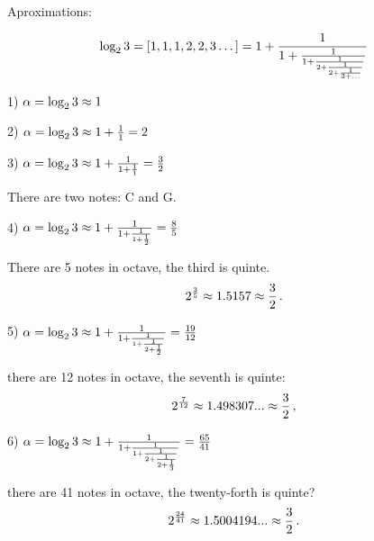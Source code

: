       Aproximations:

      $$
\log_2 3=[1,1,1,2,2,3\dots]=1+{1\over 1+{1\over 1+{1\over 2+
{1\over 2+{1\over 3+\dots}}}}}
      $$
 
  1) $\alpha=\log_2 3\approx 1$
  

  2) $\alpha=\log_2 3\approx 1+{1\over 1}=2$
  
  3) $\alpha=\log_2 3\approx 1+{1\over 1+{1\over 1}}={3\over 2}$
  
There are two notes: C and G.

\medskip

  4) $\alpha=\log_2 3\approx 1+{1\over 1+{1\over 1+{1\over 2}}}=
{8\over 5}$
  
There are 5 notes in octave,  the third is quinte.
          $$
    2^{3\over 5}\approx 1.5157\approx {3\over 2}\,.
          $$
\medskip

 5) $\alpha=\log_2 3\approx 1+{1\over 1+{1\over 1+{1\over 2+{1\over 2}}}}=
{19\over 12}$

there are 12 notes in octave, the seventh is quinte:
              $$
   2^{7\over 12}\approx 1.498307...\approx {3\over 2}\,,
          $$

\medskip

 6) $\alpha=\log_2 3\approx 
1+{1\over 1+{1\over 1+{1\over 2+{1\over 2+{1\over 3}}}}}=
{65\over 41}$

there are 41 notes in octave, the twenty-forth  is quinte?
               $$
    2^{24\over 41}\approx 1.5004194...\approx {3\over 2}\,.
          $$


         


\bye 
